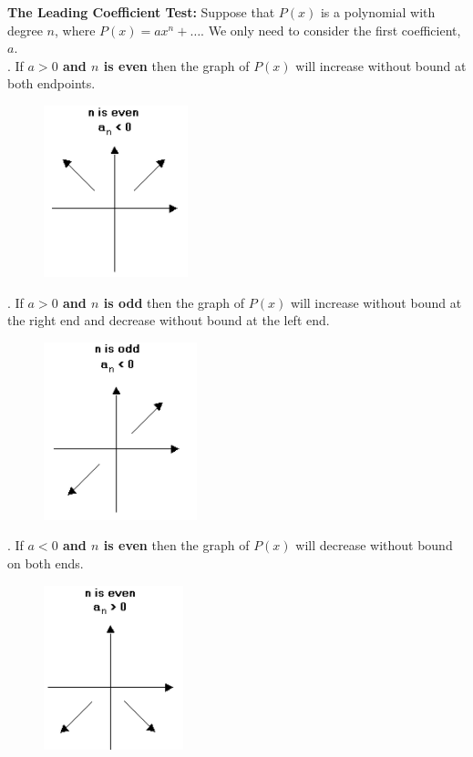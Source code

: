 \documentclass{article}
\begin{document}
    \noindent \color{purple} \textbf{The Leading Coefficient Test:} \color{black} Suppose
    that $P(x)$ is a polynomial with degree $n$, where $P(x)=ax^n+\dots$. We only need to
    consider the first coefficient, $a$. \\

    . If \textbf{$a>0$ and $n$ is even} then the graph of $P(x)$ will increase without
    bound at both endpoints. \\
    \begin{figure} [hbt!]
        \centering
        \includegraphics[scale = 0.5] {Resources/Unit4HigherPolynomials/leadcoeff1.png}
    \end{figure}

    . If \textbf{$a>0$ and $n$ is odd} then the graph of $P(x)$ will increase without bound
    at the right end and decrease without bound at the left end. \\
    \begin{figure} [hbt!]
        \centering
        \includegraphics[scale = 0.5] {Resources/Unit4HigherPolynomials/leadcoeff2.png}
    \end{figure}

    . If \textbf{$a<0$ and $n$ is even} then the graph of $P(x)$ will decrease without
    bound on both ends. \\
    \begin{figure} [hbt!]
        \centering
        \includegraphics[scale = 0.5] {Resources/Unit4HigherPolynomials/leadcoeff3.png}
    \end{figure}
\end{document}
